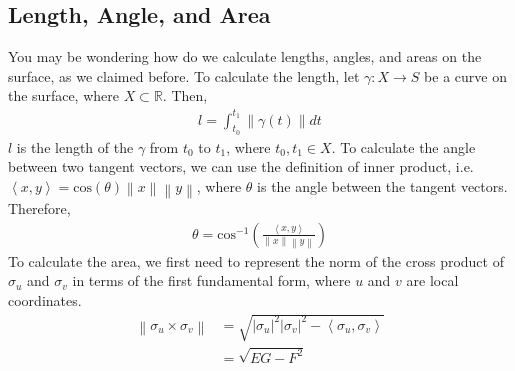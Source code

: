 \documentclass{article}
\theoremstyle{plain}
\theoremstyle{definition}
\theoremstyle{remark}
\newcommand{\R}{\mathbb{R}}
\begin{document}
\subsection{Length, Angle, and Area}
You may be wondering how do we calculate lengths, angles, and areas on the surface, as we claimed before. To calculate the length, let \( \gamma: X \rightarrow S \) be a curve on the surface, where \(X \subset \R \). Then,
\begin{align*}
    l = \int_{t_0}^{t_1} \left\lVert \gamma(t)\right\rVert dt
\end{align*}
\(l\) is the length of the \(\gamma\) from \(t_0\) to \(t_1\), where \( t_0, t_1 \in X\).
To calculate the angle between two tangent vectors, we can use the definition of inner product, i.e. \( \left\langle x, y\right\rangle = \text{cos}(\theta) \left\lVert x \right\rVert \left\lVert y \right\rVert  \), where \(\theta\) is the angle between the tangent vectors. Therefore,
\begin{align*}
    \theta = \text{cos}^{-1} \left(  \frac{\left\langle x, y\right\rangle }{\left\lVert x \right\rVert \left\lVert y \right\rVert } \right)
\end{align*}
To calculate the area, we first need to represent the norm of the cross product of \( \sigma_u \) and \( \sigma_v \) in terms of the first fundamental form, where \( u \) and \( v\) are local coordinates.
\begin{align*}
    \left\lVert \sigma_u \times \sigma_v \right\rVert & = \sqrt{\left\lvert \sigma_u\right\rvert^2 \left\lvert \sigma_v \right\rvert^2 - \left\langle \sigma_u, \sigma_v \right\rangle } \\
                                                      & = \sqrt{EG - F^2}
\end{align*}
\end{document}
